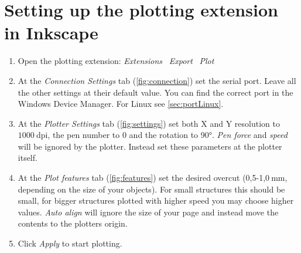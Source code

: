 {\let\clearpage\relax \chapter{Setting up the plotting extension in Inkscape}
\label{cha:extension}}
\begin{enumerate}
	\item Open the plotting extension: \textit{Extensions} \rarr\ \textit{Export} \rarr\ \textit{Plot}
	\item At the \textit{Connection Settings} tab (\autoref{fig:connection}) set the serial port. Leave all the other settings at their default value. You can find the correct port in the Windows Device Manager. For Linux see \autoref{sec:portLinux}.
	\item At the \textit{Plotter Settings} tab (\autoref{fig:settings}) set both X and Y resolution to $1000\:$dpi, the pen number to 0 and the rotation to 90°. \textit{Pen force} and \textit{speed} will be ignored by the plotter. Instead set these parameters at the plotter itself.
	\item At the \textit{Plot features} tab (\autoref{fig:features}) set the desired overcut (0,5-1,$0\:$mm, depending on the size of your objects). For small structures this should be small, for bigger structures plotted with higher speed you may choose higher values. \textit{Auto align} will ignore the size of your page and instead move the contents to the plotters origin.
	\item Click \textit{Apply} to start plotting.
\end{enumerate}

